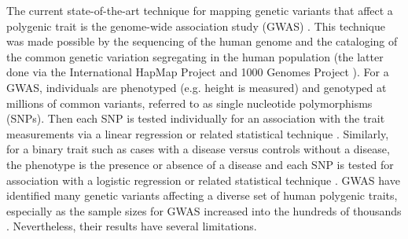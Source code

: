 The current state-of-the-art technique for mapping genetic variants
that affect a polygenic trait is the genome-wide association study
(GWAS) \citep{Hirschhorn2005}. This technique was made possible by the
sequencing of the human genome \citep{Lander2001, Venter2001, HGP2004,
  Lander2011} and the cataloging of the common genetic variation
segregating in the human population (the latter done via the
International HapMap Project \citep{HapMap2005, HapMap2007,
  HapMap2010} and 1000 Genomes Project \citep{1KG2010, 1KG2012}). For
a GWAS, individuals are phenotyped (e.g. height is measured) and
genotyped at millions of common variants, referred to as single
nucleotide polymorphisms (SNPs).  Then each SNP is tested individually
for an association with the trait measurements via a linear regression
or related statistical technique \citep{Balding2006, Stephens2009,
  Yang2014}. Similarly, for a binary trait such as cases with a
disease versus controls without a disease, the phenotype is the
presence or absence of a disease and each SNP is tested for
association with a logistic regression or related statistical
technique \citep{Chang2015}. GWAS have identified many genetic
variants affecting a diverse set of human polygenic traits, especially
as the sample sizes for GWAS increased into the hundreds of thousands
\citep{Welter2014}. Nevertheless, their results have several
limitations.

